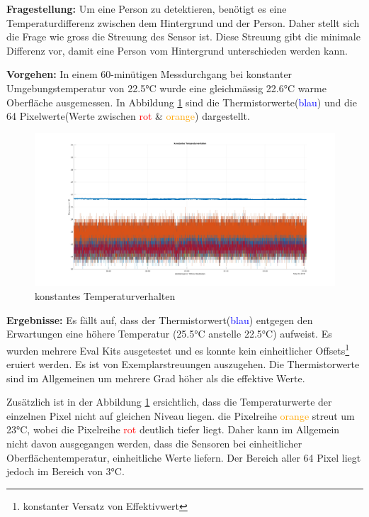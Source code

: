 \textbf{Fragestellung:} Um eine Person zu detektieren, benötigt es eine Temperaturdifferenz zwischen dem Hintergrund und der Person. Daher stellt sich die Frage wie gross die Streuung des Sensor ist. Diese Streuung gibt die minimale Differenz vor, damit eine Person vom Hintergrund unterschieden werden kann.

\textbf{Vorgehen:} In einem 60-minütigen Messdurchgang bei konstanter Umgebungstemperatur von 22.5°C wurde eine gleichmässig 22.6°C warme Oberfläche ausgemessen. In Abbildung \ref{fig:temperaturverhalten} sind die Thermistorwerte(\textcolor{blue}{blau}) und die 64 Pixelwerte(Werte zwischen \textcolor{red}{rot} \& \textcolor{orange}{orange}) dargestellt.
\begin{figure}[H]
	\centering
	\includegraphics[width=1.0\textwidth]{fig/Temperaturverhalten}
	\caption[konstantes Temperaturverhalten]{konstantes Temperaturverhalten}
	\label{fig:temperaturverhalten}
\end{figure}

\textbf{Ergebnisse:} Es fällt auf, dass  der Thermistorwert(\textcolor{blue}{blau}) entgegen den Erwartungen eine höhere Temperatur (25.5°C anstelle 22.5°C) aufweist. Es wurden mehrere Eval Kits ausgetestet und es konnte kein einheitlicher Offsets\footnote[13]{konstanter Versatz von Effektivwert} eruiert werden. Es ist von Exemplarstreuungen auszugehen. Die Thermistorwerte sind im Allgemeinen um mehrere Grad höher als die effektive Werte. 

Zusätzlich ist in der Abbildung \ref{fig:temperaturverhalten} ersichtlich, dass die Temperaturwerte der einzelnen Pixel nicht auf gleichen Niveau liegen. die Pixelreihe \textcolor{orange}{orange} streut um 23°C, wobei die Pixelreihe \textcolor{red}{rot} deutlich tiefer liegt. Daher kann im Allgemein nicht davon ausgegangen werden, dass die Sensoren bei einheitlicher Oberflächentemperatur, einheitliche Werte liefern. Der Bereich aller 64 Pixel liegt jedoch im Bereich von 3°C. 

